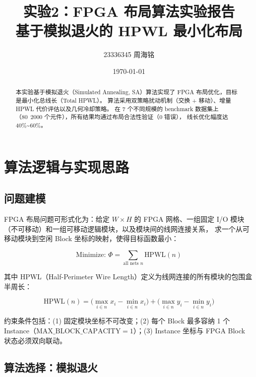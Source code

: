 \documentclass[12pt,a4paper]{ctexart}
\title{\textbf{实验2：FPGA 布局算法实验报告}\\[4pt]\large 基于模拟退火的 HPWL 最小化布局}
\author{23336345 周海铭}
\date{\today}
\begin{document}
\maketitle
\thispagestyle{fancy}

\begin{abstract}
本实验基于模拟退火（Simulated Annealing, SA）算法实现了 FPGA 布局优化，目标是最小化总线长（Total HPWL）。
算法采用双策略扰动机制（交换 + 移动）、增量 HPWL 代价评估以及几何冷却策略。
在 7 个不同规模的 benchmark 数据集上（80~2000 个元件），所有结果均通过布局合法性验证（0 错误），
线长优化幅度达 40\%\textasciitilde60\%。
\end{abstract}

\section{算法逻辑与实现思路}

\subsection{问题建模}

FPGA 布局问题可形式化为：给定 $W \times H$ 的 FPGA 网格、一组固定 I/O 模块（不可移动）和一组可移动逻辑模块，以及模块间的线网连接关系，
求一个从可移动模块到空闲 Block 坐标的映射，使得目标函数最小：

\begin{equation}
\text{Minimize: } \Phi = \sum_{\text{all nets } n} \text{HPWL}(n)
\label{eq:objective}
\end{equation}

其中 HPWL（Half-Perimeter Wire Length）定义为线网连接的所有模块的包围盒半周长：

\begin{equation}
\text{HPWL}(n) = \bigl(\max_{i \in n} x_i - \min_{i \in n} x_i\bigr) + \bigl(\max_{i \in n} y_i - \min_{i \in n} y_i\bigr)
\label{eq:hpwl}
\end{equation}

约束条件包括：(1) 固定模块坐标不可改变；(2) 每个 Block 最多容纳 1 个 Instance（$\text{MAX\_BLOCK\_CAPACITY}=1$）；(3) Instance 坐标与 FPGA Block 状态必须双向联动。

\subsection{算法选择：模拟退火}
\end{document}
